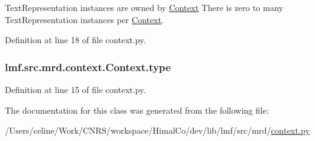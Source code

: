 Text\+Representation instances are owned by \hyperlink{classlmf_1_1src_1_1mrd_1_1context_1_1_context}{Context} There is zero to many Text\+Representation instances per \hyperlink{classlmf_1_1src_1_1mrd_1_1context_1_1_context}{Context}. 



Definition at line 18 of file context.\+py.

\hypertarget{classlmf_1_1src_1_1mrd_1_1context_1_1_context_a785d657d9be0addc379745e7efa4996b}{
\subsubsection[{type}]{\setlength{\rightskip}{0pt plus 5cm}lmf.\+src.\+mrd.\+context.\+Context.\+type}}\label{classlmf_1_1src_1_1mrd_1_1context_1_1_context_a785d657d9be0addc379745e7efa4996b}


Definition at line 15 of file context.\+py.



The documentation for this class was generated from the following file\+:\begin{DoxyCompactItemize}
\item 
/\+Users/celine/\+Work/\+C\+N\+R\+S/workspace/\+Himal\+Co/dev/lib/lmf/src/mrd/\hyperlink{context_8py}{context.\+py}\end{DoxyCompactItemize}
